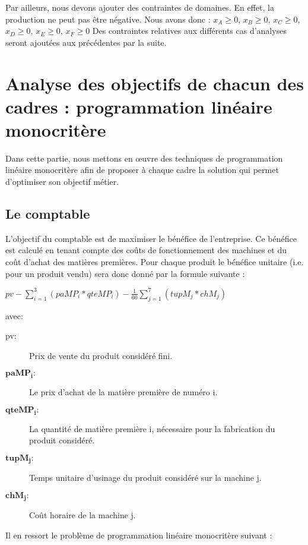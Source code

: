 \documentclass[12pt]{article}
\begin{document}
Par ailleurs, nous devons ajouter des contraintes de domaines. En effet, la production ne peut pas être négative. Nous avons donc :
$ x_{A} \geq 0$, $x_{B}  \geq 0$, $x_{C} \geq 0$, $x_{D} \geq 0$, $x_{E} \geq 0$, $x_{F} \geq 0 $
Des contraintes relatives aux différents cas d'analyses seront ajoutées aux précédentes par la suite.
\section{Analyse des objectifs de chacun des cadres : programmation linéaire monocritère}
Dans cette partie, nous mettons en œuvre des techniques de programmation linéaire monocritère afin de proposer à chaque cadre la solution qui permet d'optimiser son objectif métier.
\subsection{Le comptable}
L'objectif du comptable est de maximiser le bénéfice de l'entreprise. Ce bénéfice est calculé en tenant compte des coûts de fonctionnement des machines et du coût d'achat des matières premières. Pour chaque produit le bénéfice unitaire (i.e. pour un produit vendu) sera donc donné par la formule suivante : \begin{center} $pv - \sum_{i=1}^{3}(paMP_{i} * qteMP_{i}) - \frac{1}{60} \sum_{j=1}^{7}(tupM_{j} * chM_{j}) $ \end{center} avec:
\begin{description}
\item[pv: ]Prix de vente du produit considéré fini.
\item[$\mathbf{paMP_{i} :}$] Le prix d'achat de la matière première de numéro i.
\item[$\mathbf{qteMP_{i} :}$] La quantité de matière première i, nécessaire pour la fabrication du produit considéré.
\item[$\mathbf{tupM_{j} :}$] Temps unitaire d'usinage du produit considéré sur la machine j.
\item[$\mathbf{chM_{j} :}$] Coût horaire de la machine j.
\end{description}
Il en ressort le problème de programmation linéaire monocritère suivant : \newline 
\\
\noindent{}
\end{document}
